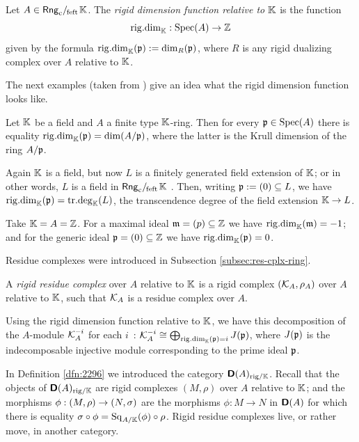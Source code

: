\begin{dfn} \label{dfn:2537}
Let $A \in \mathrm{\mathsf{Rng}}_{\mathrm{c}} /_{\mspace{-2mu} \mathrm{feft}} \mspace{2mu} \mathbb{K}$. The {\em rigid dimension function 
relative to $\mathbb{K}$} is the function
\[   \operatorname{rig{.}dim}_{\mathbb{K}} : \operatorname{Spec}(A) \to \mathbb{Z} \]
given by the formula 
$\operatorname{rig{.}dim}_{\mathbb{K}}(\mathfrak{p}) := \operatorname{dim}_R(\mathfrak{p})$,
where $R$ is any rigid dualizing complex over $A$ relative to $\mathbb{K}$. 
\end{dfn}

The next examples (taken from \cite{Ye11}) give an idea what the rigid 
dimension function looks like.  

\begin{exa} \label{exa:3235}
Let $\mathbb{K}$ be a field and $A$ a finite type $\mathbb{K}$-ring. 
Then for every $\mathfrak{p} \in \operatorname{Spec}(A)$ there is equality
$\operatorname{rig{.}dim}_{\mathbb{K}}(\mathfrak{p}) = \operatorname{dim}(A / \mathfrak{p})$, 
where the latter is the Krull dimension of the ring $A / \mathfrak{p}$. 
\end{exa}

\begin{exa} \label{exa:3236}
Again $\mathbb{K}$ is a field, but now $L$ is a finitely generated field extension of 
$\mathbb{K}$; or in other words, $L$ is a field in $\mathrm{\mathsf{Rng}}_{\mathrm{c}} /_{\mspace{-2mu} \mathrm{feft}} \mspace{2mu} \mathbb{K}$ . 
Then, writing $\mathfrak{p} := (0) \subseteq L$, we have  
$\operatorname{rig{.}dim}_{\mathbb{K}}(\mathfrak{p}) = \operatorname{tr{.}deg}_{\mathbb{K}}(L)$,
the transcendence degree of the field extension $\mathbb{K} \to L$. 
\end{exa}

\begin{exa} \label{exa:3237}
Take $\mathbb{K} = A = \mathbb{Z}$. For a maximal ideal $\mathfrak{m} = (p) \subseteq \mathbb{Z}$ we 
have $\operatorname{rig{.}dim}_{\mathbb{K}}(\mathfrak{m}) = -1$; and for the generic ideal 
$\mathfrak{p} = (0) \subseteq \mathbb{Z}$ we have $\operatorname{rig{.}dim}_{\mathbb{K}}(\mathfrak{p}) = 0$. 
\end{exa}

Residue complexes were introduced in Subsection \ref{subsec:res-cplx-ring}.

\begin{dfn} \label{dfn:2535}
A {\em rigid residue complex} 
over $A$ relative to $\mathbb{K}$ is a 
rigid complex $(\mathcal{K}_A, \rho_A)$ over $A$ relative to $\mathbb{K}$, such that $\mathcal{K}_A$ is 
a residue complex over $A$. 
\end{dfn}

Using the rigid dimension function relative to $\mathbb{K}$, we have this decomposition 
of the $A$-module $\mathcal{K}^{-i}_A$ for each $i$~:
$\mathcal{K}_A^{-i} \cong \bigoplus_{\operatorname{rig{.}dim}_{\mathbb{K}}(\mathfrak{p}) = i} J(\mathfrak{p})$,
where $J(\mathfrak{p})$ is the indecomposable injective module corresponding to the prime 
ideal $\mathfrak{p}$. 

In Definition \ref{dfn:2296} we introduced the category 
$\boldsymbol{\mathsf{D}}(A)_{\mathrm{rig} / \mathbb{K}}$. Recall that the objects of 
$\boldsymbol{\mathsf{D}}(A)_{\mathrm{rig} / \mathbb{K}}$
are rigid complexes $(M, \rho)$ over $A$ relative to $\mathbb{K}$; and the morphisms 
$\phi : (M, \rho) \to (N, \sigma)$
are the morphisms $\phi : M \to N$ in $\boldsymbol{\mathsf{D}}(A)$ for which there is equality 
$\sigma \circ \phi = \operatorname{Sq}_{A / \mathbb{K}}(\phi) \circ \rho$.
Rigid residue complexes live, or rather move, in another category. 

